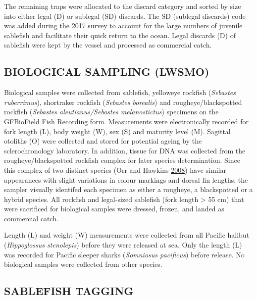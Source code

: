 \documentclass[12pt]{article}\usepackage[]{graphicx}\usepackage[]{color}
\begin{document}
The remaining traps were allocated to the discard category and sorted by size into either legal (D) or sublegal (SD) discards. The SD (sublegal discards) code was added during the 2017 survey to account for the large numbers of juvenile sablefish and facilitate their quick return to the ocean. Legal discards (D) of sablefish were kept by the vessel and processed as commercial catch.

\hypertarget{biological-sampling-lwsmo}{%
\subsection{BIOLOGICAL SAMPLING (LWSMO)}\label{biological-sampling-lwsmo}}

Biological samples were collected from sablefish, yelloweye rockfish (\emph{Sebastes ruberrimus}), shortraker rockfish (\emph{Sebastes borealis}) and rougheye/blackspotted rockfish (\emph{Sebastes aleutianus/Sebastes melanostictus}) specimens on the GFBioField Fish Recording form. Measurements were electronically recorded for fork length (L), body weight (W), sex (S) and maturity level (M). Sagittal otoliths (O) were collected and stored for potential ageing by the sclerochronology laboratory. In addition, tissue for DNA was collected from the rougheye/blackspotted rockfish complex for later species determination. Since this complex of two distinct species (Orr and Hawkins \protect\hyperlink{ref-Orr2008}{2008}) have similar appearances with slight variations in colour markings and dorsal fin lengths, the sampler visually identifed each specimen as either a rougheye, a blackspotted or a hybrid species. All rockfish and legal-sized sablefish (fork length \textgreater{} 55 cm) that were sacrificed for biological samples were dressed, frozen, and landed as commercial catch.

Length (L) and weight (W) measurements were collected from all Pacific halibut (\emph{Hippoglossus stenolepis}) before they were released at sea. Only the length (L) was recorded for Pacific sleeper sharks (\emph{Somniosus pacificus}) before release. No biological samples were collected from other species.

\hypertarget{sablefish-tagging}{%
\subsection{SABLEFISH TAGGING}\label{sablefish-tagging}}
\end{document}
